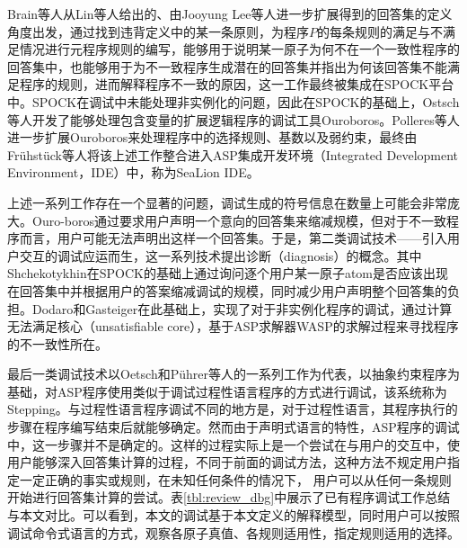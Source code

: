 Brain等人从Lin等人给出的\cite{lin2004assat}、由Jooyung Lee等人进一步扩展\cite{lee2005modeltheoretic}得到的回答集的定义角度出发，通过找到违背定义中的某一条原则，为程序$P$的每条规则的满足与不满足情况进行元程序规则的编写，能够用于说明某一原子为何不在一个一致性程序的回答集中，也能够用于为不一致程序生成潜在的回答集并指出为何该回答集不能满足程序的规则，进而解释程序不一致的原因，这一工作最终被集成在\textsf{SPOCK}平台中\cite{brain2007that,brain2007debugging}。SPOCK在调试中未能处理非实例化的问题，因此在\textsf{SPOCK}的基础上，Ostsch等人开发了能够处理包含变量的扩展逻辑程序的调试工具\textsf{Ouroboros}\cite{oetsch2010catching}。Polleres等人进一步扩展\textsf{Ouroboros}\cite{polleres2013debugging}来处理程序中的选择规则、基数以及弱约束\cite{calimeri2020aspcore2}，最终由Fr\"uhst\"uck等人将该上述工作整合进入ASP集成开发环境（Integrated Development Environment，IDE）中，称为SeaLion IDE\cite{fruhstuck2013debugging}。

上述一系列工作存在一个显著的问题，调试生成的符号信息在数量上可能会非常庞大。\textsf{Ouro-boros}通过要求用户声明一个意向的回答集来缩减规模，但对于不一致程序而言，用户可能无法声明出这样一个回答集。于是，第二类调试技术——引入用户交互的调试应运而生，这一系列技术提出诊断（diagnosis）的概念。其中Shchekotykhin在\textsf{SPOCK}的基础上通过询问逐个用户某一原子atom是否应该出现在回答集中并根据用户的答案缩减调试的规模，同时减少用户声明整个回答集的负担\cite{shchekotykhin2015interactive}。Dodaro\cite{dodaro2015interactive}和Gasteiger\cite{gasteiger2016integrated}在此基础上，实现了对于非实例化程序的调试，通过计算无法满足核心（unsatisfiable core），基于ASP求解器WASP\cite{alviano2013wasp,alviano2015advances}的求解过程来寻找程序的不一致性所在。

最后一类调试技术以Oetsch和P\"uhrer等人的一系列工作为代表\cite{oetsch2011stepping,oetsch2018stepwise,puhrer2014stepwise}，以抽象约束程序为基础，对ASP程序使用类似于调试过程性语言程序的方式进行调试，该系统称为\textsf{Stepping}。与过程性语言程序调试不同的地方是，对于过程性语言，其程序执行的步骤在程序编写结束后就能够确定。然而由于声明式语言的特性，ASP程序的调试中，这一步骤并不是确定的。这样的过程实际上是一个尝试在与用户的交互中，使用户能够深入回答集计算的过程，不同于前面的调试方法，这种方法不规定用户指定一定正确的事实或规则，在未知任何条件的情况下， 用户可以从任何一条规则开始进行回答集计算的尝试。表\ref{tbl:review_dbg}中展示了已有程序调试工作总结与本文对比。可以看到，本文的调试基于本文定义的解释模型，同时用户可以按照调试命令式语言的方式，观察各原子真值、各规则适用性，指定规则适用的选择。

